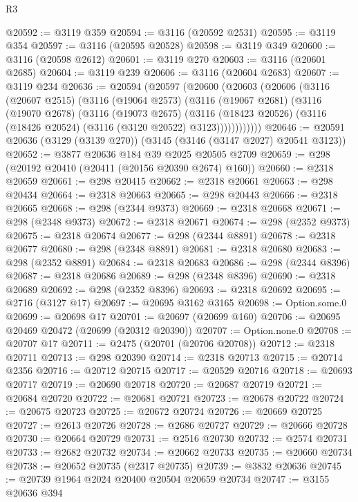 \begin{lexlean}{R3}
\begin{coremodule}
@20592 := @3119 @359
@20594 := @3116 (@20592 @2531)
@20595 := @3119 @354
@20597 := @3116 (@20595 @20528)
@20598 := @3119 @349
@20600 := @3116 (@20598 @2612)
@20601 := @3119 @270
@20603 := @3116 (@20601 @2685)
@20604 := @3119 @239
@20606 := @3116 (@20604 @2683)
@20607 := @3119 @234
@20636 := @20594
    (@20597
      (@20600
        (@20603
          (@20606
            (@3116
              (@20607 @2515)
              (@3116
                (@19064 @2573)
                (@3116
                  (@19067 @2681)
                  (@3116
                    (@19070 @2678)
                    (@3116
                      (@19073 @2675)
                      (@3116
                        (@18423 @20526)
                        (@3116 (@18426 @20524) (@3116 (@3120 @20522) @3123))))))))))))
@20646 := @20591 @20636 (@3129 (@3139 @270)) (@3145 (@3146 (@3147 @2027) @20541 @3123))
@20652 := @3877 @20636 @184 @39 @2025 @20505 @2709
@20659 := @298 (@20192 @20410 (@20411 (@20156 @20390 @2674) @160))
@20660 := @2318 @20659
@20661 := @298 @20415
@20662 := @2318 @20661
@20663 := @298 @20434
@20664 := @2318 @20663
@20665 := @298 @20443
@20666 := @2318 @20665
@20668 := @298 (@2344 @9373)
@20669 := @2318 @20668
@20671 := @298 (@2348 @9373)
@20672 := @2318 @20671
@20674 := @298 (@2352 @9373)
@20675 := @2318 @20674
@20677 := @298 (@2344 @8891)
@20678 := @2318 @20677
@20680 := @298 (@2348 @8891)
@20681 := @2318 @20680
@20683 := @298 (@2352 @8891)
@20684 := @2318 @20683
@20686 := @298 (@2344 @8396)
@20687 := @2318 @20686
@20689 := @298 (@2348 @8396)
@20690 := @2318 @20689
@20692 := @298 (@2352 @8396)
@20693 := @2318 @20692
@20695 := @2716 (@3127 @17)
@20697 := @20695 @3162 @3165
@20698 := Option.some.{0}
@20699 := @20698 @17
@20701 := @20697 (@20699 @160)
@20706 := @20695 @20469 @20472 (@20699 (@20312 @20390))
@20707 := Option.none.{0}
@20708 := @20707 @17
@20711 := @2475 (@20701 (@20706 @20708))
@20712 := @2318 @20711
@20713 := @298 @20390
@20714 := @2318 @20713
@20715 := @20714 @2356
@20716 := @20712 @20715
@20717 := @20529 @20716
@20718 := @20693 @20717
@20719 := @20690 @20718
@20720 := @20687 @20719
@20721 := @20684 @20720
@20722 := @20681 @20721
@20723 := @20678 @20722
@20724 := @20675 @20723
@20725 := @20672 @20724
@20726 := @20669 @20725
@20727 := @2613 @20726
@20728 := @2686 @20727
@20729 := @20666 @20728
@20730 := @20664 @20729
@20731 := @2516 @20730
@20732 := @2574 @20731
@20733 := @2682 @20732
@20734 := @20662 @20733
@20735 := @20660 @20734
@20738 := @20652 @20735 (@2317 @20735)
@20739 := @3832 @20636
@20745 := @20739 @1964 @2024 @20400 @20504 @20659 @20734
@20747 := @3155 @20636 @394

\end{coremodule}
\end{lexlean}
